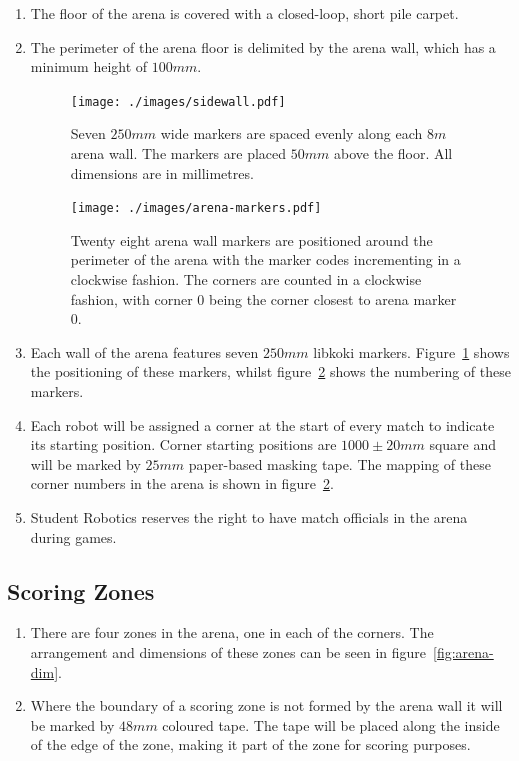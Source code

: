 \begin{enumerate}
\item The floor of the arena is covered with a closed-loop, short pile carpet.

\item The perimeter of the arena floor is delimited by the arena wall, which has a minimum height of $100mm$.

\begin{figure}
  \centering
  \texttt{[image: ./images/sidewall.pdf]}
  \caption{Seven $250mm$ wide markers are spaced evenly along each $8m$ arena wall.
           The markers are placed $50mm$ above the floor.
           All dimensions are in millimetres.}
  \label{fig:arena-wall}
\end{figure}

\begin{figure}
  \centering
  \texttt{[image: ./images/arena-markers.pdf]}
  \caption{Twenty eight arena wall markers are positioned around the perimeter of the arena with the marker codes incrementing in a clockwise fashion.
           The corners are counted in a clockwise fashion, with corner 0 being the corner closest to arena marker 0.}
  \label{fig:arena-zones}
\end{figure}

\item Each wall of the arena features seven $250mm$ libkoki markers.
      Figure~\ref{fig:arena-wall} shows the positioning of these markers, whilst figure~\ref{fig:arena-zones} shows the numbering of these markers.

\item Each robot will be assigned a corner at the start of every match to indicate its starting position.
      Corner starting positions are $1000 \pm 20mm$ square and will be marked by $25mm$ paper-based masking tape.
      The mapping of these corner numbers in the arena is shown in figure~\ref{fig:arena-zones}.

\item Student Robotics reserves the right to have match officials in the arena during games.

\end{enumerate}


\subsection{Scoring Zones}
\label{sub:Zones}

\begin{enumerate}
\item There are four zones in the arena, one in each of the corners.
      The arrangement and dimensions of these zones can be seen in figure~\ref{fig:arena-dim}.

\item Where the boundary of a scoring zone is not formed by the arena wall it will be marked by $48mm$ coloured tape.
      The tape will be placed along the inside of the edge of the zone, making it part of the zone for scoring purposes.
\end{enumerate}

